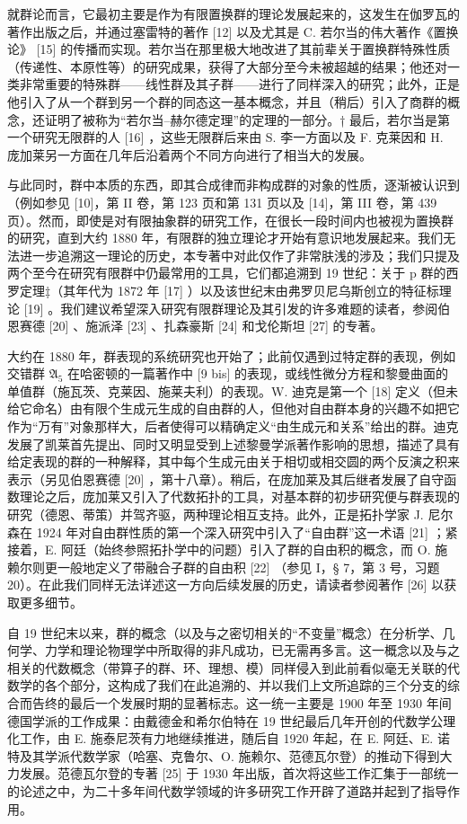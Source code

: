 就群论而言，它最初主要是作为有限置换群的理论发展起来的，这发生在伽罗瓦的著作出版之后，并通过塞雷特的著作 {[}12{]} 以及尤其是 C. 若尔当的伟大著作《置换论》 {[}15{]} 的传播而实现。若尔当在那里极大地改进了其前辈关于置换群特殊性质（传递性、本原性等）的研究成果，获得了大部分至今未被超越的结果；他还对一类非常重要的特殊群——线性群及其子群——进行了同样深入的研究；此外，正是他引入了从一个群到另一个群的同态这一基本概念，并且（稍后）引入了商群的概念，还证明了被称为“若尔当–赫尔德定理”的定理的一部分。† 最后，若尔当是第一个研究无限群的人 {[}16{]} ，这些无限群后来由 S. 李一方面以及 F. 克莱因和 H. 庞加莱另一方面在几年后沿着两个不同方向进行了相当大的发展。

与此同时，群中本质的东西，即其合成律而非构成群的对象的性质，逐渐被认识到（例如参见 {[}10{]}，第 II 卷，第 123 页和第 131 页以及 {[}14{]}，第 III 卷，第 439 页）。然而，即使是对有限抽象群的研究工作，在很长一段时间内也被视为置换群的研究，直到大约 1880 年，有限群的独立理论才开始有意识地发展起来。我们无法进一步追溯这一理论的历史，本专著中对此仅作了非常肤浅的涉及；我们只提及两个至今在研究有限群中仍最常用的工具，它们都追溯到 19 世纪：关于 p 群的西罗定理‡（其年代为 1872 年 {[}17{]} ）以及该世纪末由弗罗贝尼乌斯创立的特征标理论 {[}19{]} 。我们建议希望深入研究有限群理论及其引发的许多难题的读者，参阅伯恩赛德 {[}20{]} 、施派泽 {[}23{]} 、扎森豪斯 {[}24{]} 和戈伦斯坦 {[}27{]} 的专著。

大约在 1880 年，群表现的系统研究也开始了；此前仅遇到过特定群的表现，例如交错群 \(\mathfrak{A}_5\) 在哈密顿的一篇著作中 {[}9 bis{]} 的表现，或线性微分方程和黎曼曲面的单值群（施瓦茨、克莱因、施莱夫利）的表现。W. 迪克是第一个 {[}18{]} 定义（但未给它命名）由有限个生成元生成的自由群的人，但他对自由群本身的兴趣不如把它作为“万有”对象那样大，后者使得可以精确定义“由生成元和关系”给出的群。迪克发展了凯莱首先提出、同时又明显受到上述黎曼学派著作影响的思想，描述了具有给定表现的群的一种解释，其中每个生成元由关于相切或相交圆的两个反演之积来表示（另见伯恩赛德 {[}20{]} ，第十八章）。稍后，在庞加莱及其后继者发展了自守函数理论之后，庞加莱又引入了代数拓扑的工具，对基本群的初步研究便与群表现的研究（德恩、蒂策）并驾齐驱，两种理论相互支持。此外，正是拓扑学家 J. 尼尔森在 1924 年对自由群性质的第一个深入研究中引入了“自由群”这一术语 {[}21{]} ；紧接着，E. 阿廷（始终参照拓扑学中的问题）引入了群的自由积的概念，而 O. 施赖尔则更一般地定义了带融合子群的自由积 {[}22{]} （参见 I，§ 7，第 3 号，习题 20）。在此我们同样无法详述这一方向后续发展的历史，请读者参阅著作 {[}26{]} 以获取更多细节。

自 19 世纪末以来，群的概念（以及与之密切相关的“不变量”概念）在分析学、几何学、力学和理论物理学中所取得的非凡成功，已无需再多言。这一概念以及与之相关的代数概念（带算子的群、环、理想、模）同样侵入到此前看似毫无关联的代数学的各个部分，这构成了我们在此追溯的、并以我们上文所追踪的三个分支的综合而告终的最后一个发展时期的显著标志。这一统一主要是 1900 年至 1930 年间德国学派的工作成果：由戴德金和希尔伯特在 19 世纪最后几年开创的代数学公理化工作，由 E. 施泰尼茨有力地继续推进，随后自 1920 年起，在 E. 阿廷、E. 诺特及其学派代数学家（哈塞、克鲁尔、O. 施赖尔、范德瓦尔登）的推动下得到大力发展。范德瓦尔登的专著 {[}25{]} 于 1930 年出版，首次将这些工作汇集于一部统一的论述之中，为二十多年间代数学领域的许多研究工作开辟了道路并起到了指导作用。

